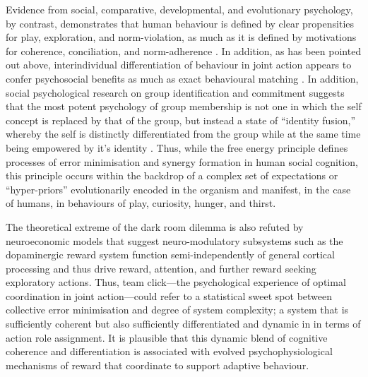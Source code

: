 \begin{CJK}{UTF8}{gbsn}
Evidence from social, comparative, developmental, and evolutionary psychology, by contrast, demonstrates that human behaviour is defined by clear propensities for play, exploration, and norm-violation, as much as it is defined by motivations for coherence, conciliation, and norm-adherence \citep{McNeill1995,Huizinga2003}. In addition, as has been pointed out above, interindividual differentiation of behaviour in joint action appears to confer psychosocial benefits as much as exact behavioural matching \citep{Milward2016}.
In addition, social psychological research on group identification and commitment suggests that the most potent psychology of group membership is not one in which the self concept is replaced by that of the group, but instead a state of ``identity fusion,'' whereby the self is distinctly differentiated from the group while at the same time being empowered by it's identity \citep{Swann2012,Swann2015,Whitehouse2014}. Thus, while the free energy principle defines processes of error minimisation and synergy formation in human social cognition, this principle occurs within the backdrop of a complex set of expectations or ``hyper-priors'' evolutionarily encoded in the organism and manifest, in the case of humans, in behaviours of play, curiosity, hunger, and thirst\citep{Clark2013}.

The theoretical extreme of the dark room dilemma is also refuted by neuroeconomic models that suggest neuro-modulatory subsystems such as the dopaminergic reward system function semi-independently of general cortical processing and thus drive reward, attention, and further reward seeking exploratory actions\citep{Ross2013}.
Thus, team click---the psychological experience of optimal coordination in joint action---could refer to a statistical sweet spot between collective error minimisation and degree of system complexity; a system that is sufficiently coherent but also sufficiently differentiated and dynamic in in terms of action role assignment.  It is plausible that this dynamic blend of cognitive coherence and differentiation is associated with evolved psychophysiological mechanisms of reward that coordinate to support adaptive behaviour\citep{Friston2010,Clark2013}.


\end{CJK}
